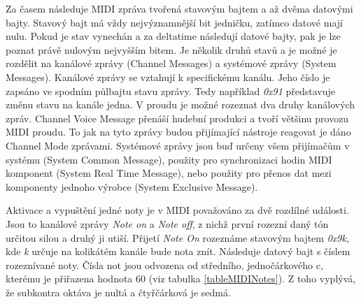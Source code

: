 Za časem následuje MIDI zpráva tvořená stavovým bajtem 
a až dvěma datovými bajty.
Stavový bajt má vždy nejvýznamnější bit jedničku,
zatímco datové mají nulu.
Pokud je stav vynechán a za deltatime následují datové bajty, 
pak je lze poznat právě nulovým nejvyšším bitem.
Je několik druhů stavů a je možné je rozdělit na 
kanálové zprávy (Channel Messages) 
a systémové zprávy (System Messages).
Kanálové zprávy se vztahují k specifickému kanálu.
Jeho číslo je zapsáno ve spodním půlbajtu stavu zprávy.
Tedy například \emph{0x91} představuje změnu stavu na kanále jedna.
V proudu je možné rozeznat dva druhy kanálových zpráv.
Channel Voice Message přenáší hudební produkci 
a tvoří většinu provozu MIDI proudu.
To jak na tyto zprávy budou přijímající nástroje reagovat 
je dáno Channel Mode zprávami.
Systémové zprávy jsou buď 
určeny všem přijímačům v systému (System Common Message),
použity pro synchronizaci hodin MIDI komponent (System Real Time Message), 
nebo použity pro přenos dat mezi komponenty jednoho výrobce 
(System Exclusive Message). 
\cite{Back_SMF_Specif}
\par

Aktivace a vypuštění jedné noty je v MIDI považováno za dvě rozdílné události.
Jsou to kanálové zprávy \emph{Note on} a \emph{Note off},
z nichž první rozezní daný tón určitou silou a druhý ji utiší.
Přijetí \emph{Note On} rozeznáme stavovým bajtem \emph{0x9k}, 
kde \emph{k} určuje na kolikátém kanále bude nota znít.
Následuje datový bajt s číslem rozeznívané noty.
Čísla not jsou odvozena od středního, jednočárkového c, 
kterému je přiřazena hodnota 60 (viz tabulka \ref{tableMIDINotes}).
Z toho vyplývá, že subkontra oktáva je nultá a čtyřčárková je sedmá.


